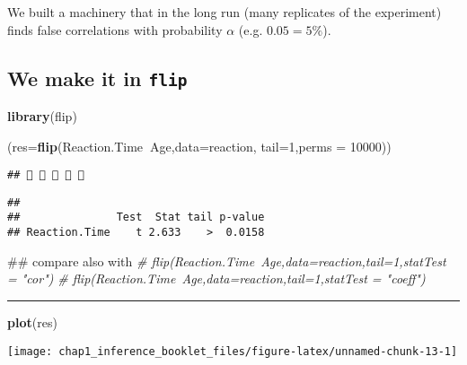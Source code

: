 \documentclass[]{article}
\newenvironment{Shaded}{\begin{snugshade}}{\end{snugshade}}
\newcommand{\KeywordTok}[1]{\textcolor[rgb]{0.13,0.29,0.53}{\textbf{#1}}}
\newcommand{\DataTypeTok}[1]{\textcolor[rgb]{0.13,0.29,0.53}{#1}}
\newcommand{\DecValTok}[1]{\textcolor[rgb]{0.00,0.00,0.81}{#1}}
\newcommand{\CommentTok}[1]{\textcolor[rgb]{0.56,0.35,0.01}{\textit{#1}}}
\newcommand{\OperatorTok}[1]{\textcolor[rgb]{0.81,0.36,0.00}{\textbf{#1}}}
\newcommand{\NormalTok}[1]{#1}
\begin{document}
We built a machinery that in the long run (many replicates of the
experiment) finds false correlations with probability \(\alpha\) (e.g.
\(0.05=5\%\)).

\subsection{\texorpdfstring{We make it in
\texttt{flip}}{We make it in flip}}\label{we-make-it-in-flip}

\begin{Shaded}
\begin{Highlighting}[]
\KeywordTok{library}\NormalTok{(flip)}

\NormalTok{(}\DataTypeTok{res=}\KeywordTok{flip}\NormalTok{(Reaction.Time}\OperatorTok{~}\NormalTok{Age,}\DataTypeTok{data=}\NormalTok{reaction,}
          \DataTypeTok{tail=}\DecValTok{1}\NormalTok{,}\DataTypeTok{perms =} \DecValTok{10000}\NormalTok{))}
\end{Highlighting}
\end{Shaded}

\begin{verbatim}
##     
\end{verbatim}

\begin{verbatim}
## 
##               Test  Stat tail p-value
## Reaction.Time    t 2.633    >  0.0158
\end{verbatim}

\begin{Shaded}
\begin{Highlighting}[]
\NormalTok{## compare also with}
\CommentTok{# flip(Reaction.Time~Age,data=reaction,tail=1,statTest = "cor")}
\CommentTok{# flip(Reaction.Time~Age,data=reaction,tail=1,statTest = "coeff")}
\end{Highlighting}
\end{Shaded}

\begin{center}\rule{0.5\linewidth}{\linethickness}\end{center}

\begin{Shaded}
\begin{Highlighting}[]
\KeywordTok{plot}\NormalTok{(res)}
\end{Highlighting}
\end{Shaded}

\begin{center}\texttt{[image: chap1\_inference\_booklet\_files/figure-latex/unnamed-chunk-13-1]} \end{center}
\end{document}
